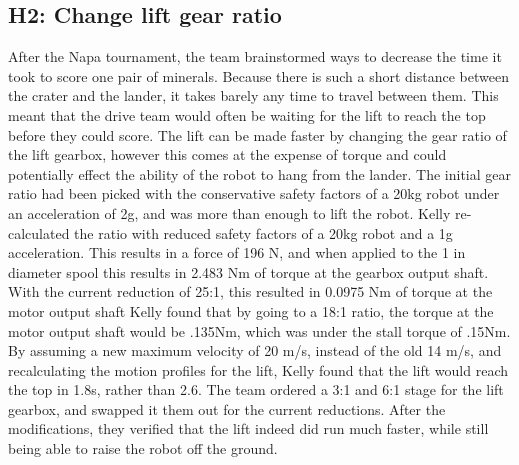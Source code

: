 \documentclass{article}
\begin{document}
\subsection{H2: Change lift gear ratio}

After the Napa tournament, the team brainstormed ways to decrease the time it took to score one pair of minerals. 
Because there is such a short distance between the crater and the lander, it takes barely any time to travel between them. 
This meant that the drive team would often be waiting for the lift to reach the top before they could score.
The lift can be made faster by changing the gear ratio of the lift gearbox, however this comes at the expense of torque and could potentially effect the ability of the robot to hang from the lander.
The initial gear ratio had been picked with the conservative safety factors of a 20kg robot under an acceleration of 2g, and was more than enough to lift the robot. 
Kelly re-calculated the ratio with reduced safety factors of a 20kg robot and a 1g acceleration. 
This results in a force of 196 N, and when applied to the 1 in diameter spool this results in 2.483 Nm of torque at the gearbox output shaft.
With the current reduction of 25:1, this resulted in 0.0975 Nm of torque at the motor output shaft
Kelly found that by going to a 18:1 ratio, the torque at the motor output shaft would be .135Nm, which was under the stall torque of .15Nm.
By assuming a new maximum velocity of 20 m/s, instead of the old 14 m/s, and recalculating the motion profiles for the lift, Kelly found that the lift would reach the top in 1.8s, rather than 2.6.
The team ordered a 3:1 and 6:1 stage for the lift gearbox, and swapped it them out for the current reductions.
After the modifications, they verified that the lift indeed did run much faster, while still being able to raise the robot off the ground. 
\end{document}
